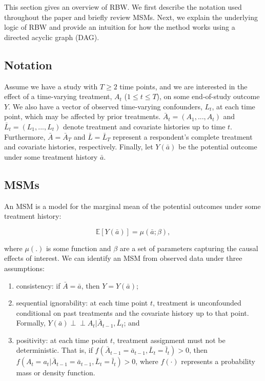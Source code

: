 This section gives an overview of RBW. We first describe the notation
used throughout the paper and briefly review MSMs. Next, we explain the
underlying logic of RBW and provide an intuition for how the method
works using a directed acyclic graph (DAG).

\hypertarget{notation}{%
\subsection{Notation}\label{notation}}

Assume we have a study with \(T\ge2\) time points, and we are interested
in the effect of a time-varying treatment, \(A_{t}\) (\(1\le t \le T\)),
on some end-of-study outcome \(Y\). We also have a vector of observed
time-varying confounders, \(L_{t}\), at each time point, which may be
affected by prior treatments. \(\bar{A}_{t}=(A_{1},...,A_{t})\) and
\(\bar{L}_{t}=(L_{1},...,L_{t})\) denote treatment and covariate
histories up to time \(t\). Furthermore, \(\bar{A}=\bar{A}_{T}\) and
\(\bar{L}=\bar{L}_{T}\) represent a respondent's complete treatment and
covariate histories, respectively. Finally, let \(Y(\bar{a})\) be the
potential outcome under some treatment history \(\bar{a}\).

\hypertarget{msms}{%
\subsection{MSMs}\label{msms}}

An MSM is a model for the marginal mean of the potential outcomes under
some treatment history:

\begin{equation}
\label{eq:1}
\mathbb{E}[Y(\bar{a})]=\mu(\bar{a};\beta),
\end{equation}

where \(\mu(.)\) is some function and \(\beta\) are a set of parameters
capturing the causal effects of interest. We can identify an MSM from
observed data under three assumptions:

\begin{enumerate}
\def\labelenumi{\arabic{enumi}.}
\tightlist
\item
  consistency: if \(\bar{A}=\bar{a}\), then \(Y=Y(\bar{a})\);
\item
  sequential ignorability: at each time point \(t\), treatment is
  unconfounded conditional on past treatments and the covariate history
  up to that point. Formally,
  \(Y(\bar{a})\perp \!\!\! \perp A_{t}|\bar{A}_{t-1},\bar{L}_{t}\); and
\item
  positivity: at each time point \(t\), treatment assignment must not be
  deterministic. That is, if
  \(f(\bar{A}_{t-1}=\bar{a}_{t-1}, \bar{L}_{t}=\bar{l}_{t})>0\), then
  \(f(A_{t}=a_{t}|\bar{A}_{t-1}=\bar{a}_{t-1}, \bar{L}_{t}=\bar{l}_{t})>0\),
  where \(f(\cdot)\) represents a probability mass or density function.
\end{enumerate}

